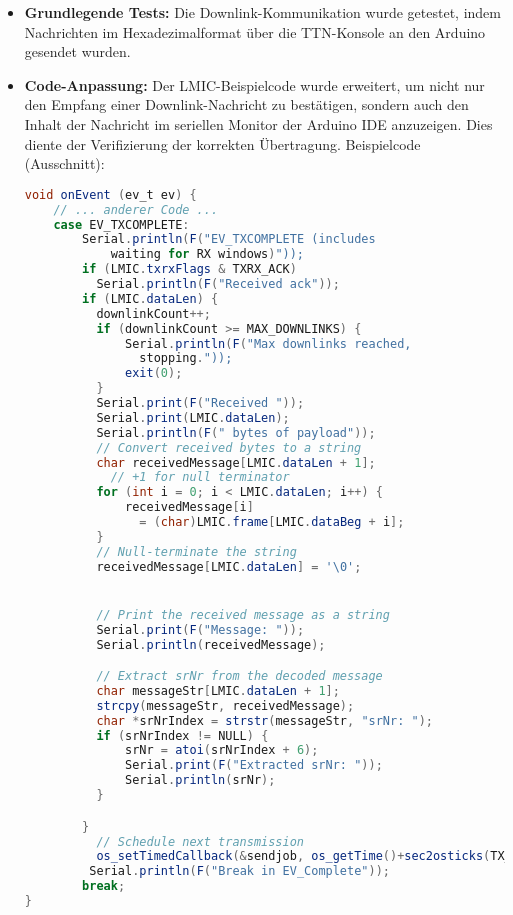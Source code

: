 \documentclass[12pt,a4paper]{article}
\begin{document}
\begin{itemize}
    \item \textbf{Grundlegende Tests:} Die Downlink-Kommunikation wurde getestet, indem Nachrichten im Hexadezimalformat über die TTN-Konsole an den Arduino gesendet wurden.
    \item \textbf{Code-Anpassung:} Der LMIC-Beispielcode wurde erweitert, um nicht nur den Empfang einer Downlink-Nachricht zu bestätigen, sondern auch den Inhalt der Nachricht im seriellen Monitor der Arduino IDE anzuzeigen. Dies diente der Verifizierung der korrekten Übertragung.  Beispielcode (Ausschnitt):

    \begin{lstlisting}[language=Java, caption=Arduino Code für Downlink-Anzeige, basicstyle=\scriptsize, showstringspaces=false]
void onEvent (ev_t ev) {
    // ... anderer Code ...
    case EV_TXCOMPLETE:
        Serial.println(F("EV_TXCOMPLETE (includes 
            waiting for RX windows)"));
        if (LMIC.txrxFlags & TXRX_ACK)
          Serial.println(F("Received ack"));
        if (LMIC.dataLen) {
          downlinkCount++;
          if (downlinkCount >= MAX_DOWNLINKS) {
              Serial.println(F("Max downlinks reached,
                stopping."));
              exit(0);
          }
          Serial.print(F("Received "));
          Serial.print(LMIC.dataLen);
          Serial.println(F(" bytes of payload"));
          // Convert received bytes to a string
          char receivedMessage[LMIC.dataLen + 1]; 
            // +1 for null terminator
          for (int i = 0; i < LMIC.dataLen; i++) {
              receivedMessage[i] 
                = (char)LMIC.frame[LMIC.dataBeg + i];
          }
          // Null-terminate the string
          receivedMessage[LMIC.dataLen] = '\0'; 


          // Print the received message as a string
          Serial.print(F("Message: "));
          Serial.println(receivedMessage);

          // Extract srNr from the decoded message
          char messageStr[LMIC.dataLen + 1]; 
          strcpy(messageStr, receivedMessage); 
          char *srNrIndex = strstr(messageStr, "srNr: "); 
          if (srNrIndex != NULL) {
              srNr = atoi(srNrIndex + 6); 
              Serial.print(F("Extracted srNr: "));
              Serial.println(srNr);
          }

        }
          // Schedule next transmission
          os_setTimedCallback(&sendjob, os_getTime()+sec2osticks(TX_INTERVAL), do_send);
         Serial.println(F("Break in EV_Complete"));
        break;
}
    \end{lstlisting}
\end{itemize}
\end{document}
